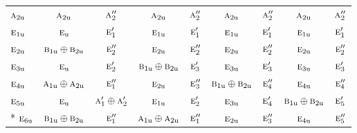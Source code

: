 \documentclass[10pt,a4paper]{article}
\numberwithin{equation}{section}
\newcommand{\irr}[1]{\text{\normalfont\scshape #1}}
\newcommand{\ptag}[1]{\mathrm{#1}}
\begin{document}
{\begin{longtable}{@{}lcccccccc@{}}
$\irr{a}_{2\ptag{u}}$ & $\irr{a}_{2\ptag{u}}$ & $\irr{a}_{2}''$ & $\irr{a}_{2\ptag{u}}$ & $\irr{a}_{2}''$ & $\irr{a}_{2\ptag{u}}$ & $\irr{a}_{2}''$ & $\irr{a}_{2\ptag{u}}$ & $\irr{a}_{2}''$\\
$\irr{e}_{1\ptag{u}}$ & $\irr{e}_{\ptag{u}}$ & $\irr{e}_{1}'$ & $\irr{e}_{1\ptag{u}}$ & $\irr{e}_{1}'$ & $\irr{e}_{1\ptag{u}}$ & $\irr{e}_{1}'$ & $\irr{e}_{1\ptag{u}}$ & $\irr{e}_{1}'$\\
$\irr{e}_{2\ptag{u}}$ & $\irr{b}_{1\ptag{u}}\oplus \irr{b}_{2\ptag{u}}$ & $\irr{e}_{2}''$ & $\irr{e}_{2\ptag{u}}$ & $\irr{e}_{2}''$ & $\irr{e}_{2\ptag{u}}$ & $\irr{e}_{2}''$ & $\irr{e}_{2\ptag{u}}$ & $\irr{e}_{2}''$\\
$\irr{e}_{3\ptag{u}}$ & $\irr{e}_{\ptag{u}}$ & $\irr{e}_{2}'$ & $\irr{b}_{1\ptag{u}}\oplus \irr{b}_{2\ptag{u}}$ & $\irr{e}_{3}'$ & $\irr{e}_{3\ptag{u}}$ & $\irr{e}_{3}'$ & $\irr{e}_{3\ptag{u}}$ & $\irr{e}_{3}'$\\
$\irr{e}_{4\ptag{u}}$ & $\irr{a}_{1\ptag{u}}\oplus \irr{a}_{2\ptag{u}}$ & $\irr{e}_{1}''$ & $\irr{e}_{2\ptag{u}}$ & $\irr{e}_{3}''$ & $\irr{b}_{1\ptag{u}}\oplus \irr{b}_{2\ptag{u}}$ & $\irr{e}_{4}''$ & $\irr{e}_{4\ptag{u}}$ & $\irr{e}_{4}''$\\
$\irr{e}_{5\ptag{u}}$ & $\irr{e}_{\ptag{u}}$ & $\irr{a}_{1}'\oplus \irr{a}_{2}'$ & $\irr{e}_{1\ptag{u}}$ & $\irr{e}_{2}'$ & $\irr{e}_{3\ptag{u}}$ & $\irr{e}_{4}'$ & $\irr{b}_{1\ptag{u}}\oplus \irr{b}_{2\ptag{u}}$ & $\irr{e}_{5}'$\\*
$\irr{e}_{6\ptag{u}}$ & $\irr{b}_{1\ptag{u}}\oplus \irr{b}_{2\ptag{u}}$ & $\irr{e}_{1}''$ & $\irr{a}_{1\ptag{u}}\oplus \irr{a}_{2\ptag{u}}$ & $\irr{e}_{1}''$ & $\irr{e}_{2\ptag{u}}$ & $\irr{e}_{3}''$ & $\irr{e}_{4\ptag{u}}$ & $\irr{e}_{5}''$\\
\bottomrule\end{longtable}}
\end{document}
